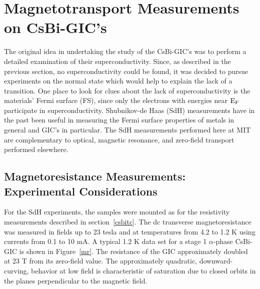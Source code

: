 \section{Mag\-ne\-to\-trans\-port Mea\-sure\-ments on CsBi-GIC's}
\label{csbisdh}

	The original idea in undertaking the study of the CsBi-GIC's was to
perform  a detailed  examination of   their  superconductivity.  Since,  as
described in the previous section, no superconductivity  could be found, it
was decided to pursue experiments on the normal state which  would  help to
explain the lack of a  transition.  One place  to look for  clues about the
lack of  superconductivity is the  materials' Fermi surface (FS), since only the
electrons  with energies near  $\rm E_F$ participate  in superconductivity.
Shubnikov-de Haas  (SdH)  measurements have in  the   past   been useful in
measuring    the     Fermi     surface    properties    of     metals    in
general\cite{ashcroft76} and GIC's  in particular.\cite{M98,Z260}  The  SdH
measurements   performed    here     at    MIT   are      complementary  to
optical,\cite{yang88} magnetic resonance,\cite{stang88a} and zero-field
transport\cite{mareche86} performed elsewhere.

\subsection{Magnetoresistance Measurements: Experimental Considerations}
\label{sdh:exp}

	For  the SdH experiments,   the   samples were mounted  as  for the
resistivity   measurements   described   in  section~\ref{csbitc}.  The  dc
transverse magnetoresistance was measured in fields  up to 23 tesla  and at
temperatures from 4.2 to 1.2 K using currents from 0.1 to 10 mA.  A typical
1.2 K  data   set for  a   stage  1  $\alpha$-phase CsBi-GIC is   shown  in
Figure~\ref{mr}.  The  resistance of the GIC approximately  doubled  at 23 T
from its zero-field  value.  The approximately quadratic, downward-curving,
behavior at low field is characteristic of saturation  due to closed orbits
in the planes perpendicular to the magnetic field.\cite{Z260}  

